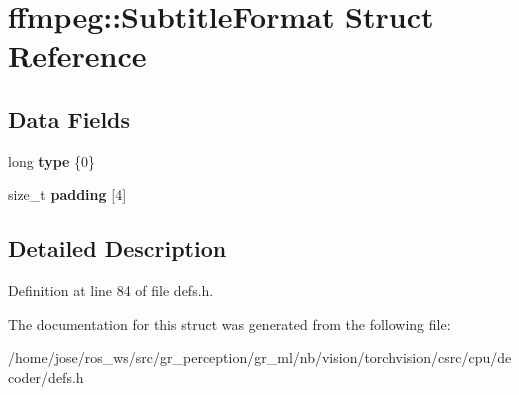 \hypertarget{structffmpeg_1_1SubtitleFormat}{}\section{ffmpeg\+:\+:Subtitle\+Format Struct Reference}
\label{structffmpeg_1_1SubtitleFormat}
\subsection*{Data Fields}
\begin{DoxyCompactItemize}
\item 
\mbox{\label{structffmpeg_1_1SubtitleFormat_a175d7a91a8c054965dab96d1f52e26ec}} 
long {\bfseries type} \{0\}
\item 
\mbox{\label{structffmpeg_1_1SubtitleFormat_a060da7fc632b1122d3ab9bbaec2b95db}} 
size\+\_\+t {\bfseries padding} \mbox{[}4\mbox{]}
\end{DoxyCompactItemize}


\subsection{Detailed Description}


Definition at line 84 of file defs.\+h.



The documentation for this struct was generated from the following file\+:\begin{DoxyCompactItemize}
\item 
/home/jose/ros\+\_\+ws/src/gr\+\_\+perception/gr\+\_\+ml/nb/vision/torchvision/csrc/cpu/decoder/defs.\+h\end{DoxyCompactItemize}
